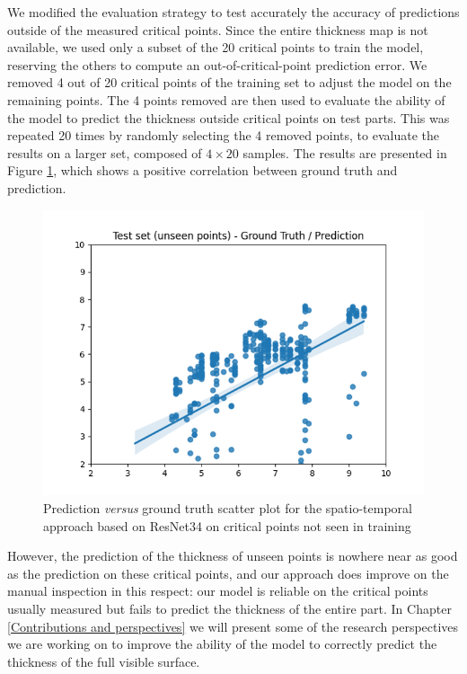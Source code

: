 We modified the evaluation strategy to test accurately the accuracy of predictions outside of the measured critical points.
Since the entire thickness map is not available, we used only a subset of the 20 critical points to train the model, reserving the others to compute an out-of-critical-point prediction error. We removed 4 out of 20 critical points of the training set to adjust the model on the remaining points. The 4 points removed are then used to evaluate the ability of the model to predict the thickness outside critical points on test parts. This was repeated 20 times by randomly selecting the 4 removed points, to evaluate the results on a larger set, composed of $4\times20$ samples.
The results are presented in Figure \ref{fig:gt_prediction_unseen}, which shows a positive correlation between ground truth and prediction. 
%
\begin{figure}
\centering
\includegraphics[scale=0.90]{images/chapter_4/unseen_point_scatter.png}
\caption{Prediction \textit{versus} ground truth scatter plot for the spatio-temporal approach based on ResNet34 on critical points not seen in training}
\label{fig:gt_prediction_unseen}
\end{figure}
%
However, the prediction of the thickness of unseen points is nowhere near as good as the prediction on these critical points, and our approach does improve on the manual inspection in this respect: our model is reliable on the critical points usually measured but fails to predict the thickness of the entire part. In Chapter \ref{Contributions and perspectives} we will present some of the research perspectives we are working on to improve the ability of the model to correctly predict the thickness of the full visible surface. 

